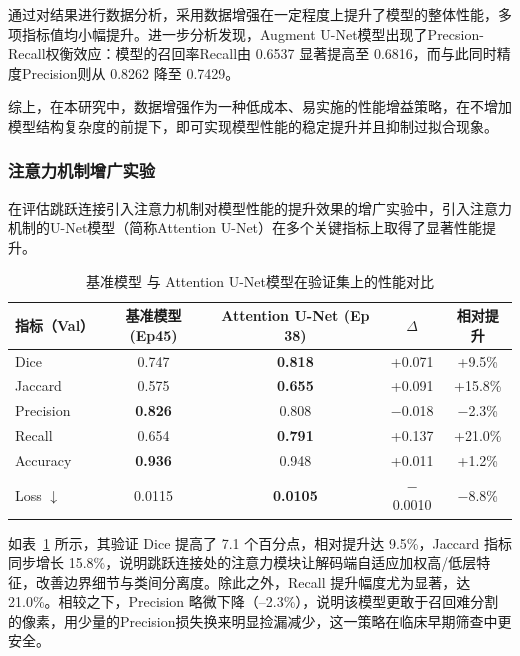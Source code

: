 通过对结果进行数据分析，采用数据增强在一定程度上提升了模型的整体性能，多项指标值均小幅提升。进一步分析发现，Augment U-Net模型出现了Precsion-Recall权衡效应：模型的召回率Recall由 0.6537 显著提高至 0.6816，而与此同时精度Precision则从 0.8262 降至 0.7429。


综上，在本研究中，数据增强作为一种低成本、易实施的性能增益策略，在不增加模型结构复杂度的前提下，即可实现模型性能的稳定提升并且抑制过拟合现象。

\subsubsection{注意力机制增广实验}

在评估跳跃连接引入注意力机制对模型性能的提升效果的增广实验中，引入注意力机制的U-Net模型（简称Attention U-Net）在多个关键指标上取得了显著性能提升。

\begin{table}[htbp]
    \centering
    \caption{基准模型 与 Attention U-Net模型在验证集上的性能对比}
    \label{tab:att_unet}
    \begin{tabular}{lcccc}
        \toprule
        指标（Val） & 基准模型 (Ep45) & Attention U-Net (Ep 38) &  $\Delta$ & 相对提升 \\
        \midrule
        Dice        & 0.747 & \textbf{0.818} & +0.071 & +9.5\% \\
        Jaccard     & 0.575 & \textbf{0.655} & +0.091 & +15.8\% \\
        Precision   & \textbf{0.826} & 0.808 & $-$0.018 & $-$2.3\% \\
        Recall      & 0.654 & \textbf{0.791} & +0.137 & +21.0\% \\
        Accuracy    & \textbf{0.936} & 0.948 & +0.011 & +1.2\% \\
        Loss $\downarrow$ & 0.0115 & \textbf{0.0105} & $-$0.0010 & $-$8.8\% \\
        \bottomrule
    \end{tabular}
\end{table}

如表~\ref{tab:att_unet} 所示，其验证 Dice 提高了 7.1 个百分点，相对提升达 9.5\%，Jaccard 指标同步增长 15.8\%，说明跳跃连接处的注意力模块让解码端自适应加权高/低层特征，改善边界细节与类间分离度。除此之外，Recall 提升幅度尤为显著，达 21.0\%。相较之下，Precision 略微下降（–2.3\%），说明该模型更敢于召回难分割的像素，用少量的Precision损失换来明显捡漏减少，这一策略在临床早期筛查中更安全。

